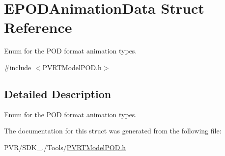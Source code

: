 \hypertarget{struct_e_p_o_d_animation_data}{\section{E\+P\+O\+D\+Animation\+Data Struct Reference}
\label{struct_e_p_o_d_animation_data}
}


Enum for the P\+O\+D format animation types.  




{\ttfamily \#include $<$P\+V\+R\+T\+Model\+P\+O\+D.\+h$>$}



\subsection{Detailed Description}
Enum for the P\+O\+D format animation types. 



 

The documentation for this struct was generated from the following file\+:\begin{DoxyCompactItemize}
\item 
P\+V\+R/\+S\+D\+K\+\_./\+Tools/\hyperlink{_p_v_r_t_model_p_o_d_8h}{P\+V\+R\+T\+Model\+P\+O\+D.\+h}\end{DoxyCompactItemize}

